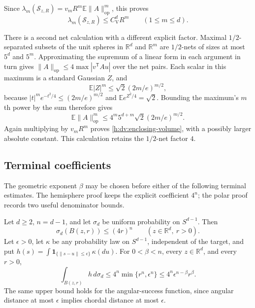 Since
\(\lambda_m(\mathcal S_{z,R})
 =v_mR^m\mathbb E\|A\|_{\mathrm{op}}^m\), this proves
\begin{equation}\label{h:dv:enclosing-volume}
 \lambda_m(\mathcal S_{z,R})\le C_{\mathrm V}^dR^m
 \qquad(1\le m\le d).
\end{equation}

There is a second net calculation with a different explicit factor.
Maximal \(1/2\)-separated subsets of the unit spheres in
\(\mathbb R^d\) and \(\mathbb R^m\) are \(1/2\)-nets of sizes at most
\(5^d\) and \(5^m\).  Approximating the supremum of a linear form in
each argument in turn gives
\(\|A\|_{\mathrm{op}}\le4\max|v^{\mathsf T}Au|\) over the net pairs.
Each scalar in this maximum is a standard Gaussian \(Z\), and
\[
 \mathbb E|Z|^m
 \le\sqrt2(2m/e)^{m/2},
\]
because \(|t|^me^{-t^2/4}\le(2m/e)^{m/2}\) and
\(\mathbb E e^{Z^2/4}=\sqrt2\).  Bounding the maximum's \(m\)th power
by the sum therefore gives
\begin{equation}
 \mathbb E\|A\|_{\mathrm{op}}^m
 \le4^m5^{d+m}\sqrt2(2m/e)^{m/2}.
 \label{h:dv:half-net}
\end{equation}
Again multiplying by \(v_mR^m\) proves
\eqref{h:dv:enclosing-volume}, with a possibly larger absolute
constant.  This calculation retains the \(1/2\)-net factor \(4\).

\subsection{Terminal coefficients}

The geometric exponent \(\beta\) may be chosen before either of
the following terminal estimates. The hemisphere proof keeps the
explicit coefficient \(4^n\); the polar proof records two useful
denominator bounds.

\begin{lemma}
\label{h:dv:hemisphere-cap}
Let \(d\ge2\), \(n=d-1\), and let \(\sigma_d\) be uniform probability
on \(S^{d-1}\).  Then
\begin{equation}
 \sigma_d(B(z,r))\le(4r)^n
 \qquad(z\in\mathbb R^d,\ r>0).
 \label{h:dv:hemisphere-ball}
\end{equation}
Let \(\epsilon>0\), let \(\kappa\) be any probability law on
\(S^{d-1}\), independent of the target, and put
\(h(s)=\int\mathbf 1_{\{\|s-u\|\le\epsilon\}}\,\kappa(du)\).
For \(0<\beta<n\), every \(z\in\mathbb R^d\), and every \(r>0\),
\begin{equation}
 \int_{B(z,r)}h\,d\sigma_d
 \le4^n\min\{r^n,\epsilon^n\}
 \le4^n\epsilon^{n-\beta}r^\beta.
 \label{h:dv:terminal-coefficient}
\end{equation}
The same upper bound holds for the angular-success function, since
angular distance at most \(\epsilon\) implies chordal distance at most
\(\epsilon\).
\end{lemma}

